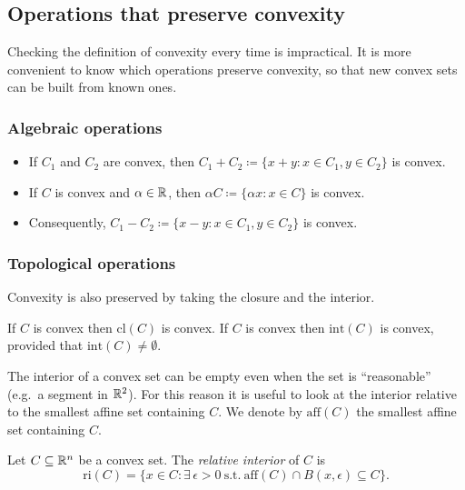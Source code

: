 \subsection{Operations that preserve convexity}

Checking the definition of convexity every time is impractical. It is more convenient to know which operations preserve convexity, so that new convex sets can be built from known ones.

\pagebreak
\subsubsection{Algebraic operations}

\begin{lemma}
\leavevmode
\begin{itemize}
    \item If $C_1$ and $C_2$ are convex, then $C_1 + C_2\coloneqq \{x+y: x \in C_1, y \in C_2\}$ is convex.
    \item If $C$ is convex and $\alpha \in \mathbb{R}$, then $\alpha C \coloneqq \{\alpha x : x \in C\}$ is convex.
    \item Consequently, $C_1 - C_2\coloneqq \{x-y: x \in C_1, y \in C_2\}$ is convex.
\end{itemize}
\end{lemma}

\subsubsection{Topological operations}

Convexity is also preserved by taking the closure and the interior.

\begin{lemma}
If $C$ is convex then $\mathrm{cl}(C)$ is convex.
If $C$ is convex then $\mathrm{int}(C)$ is convex, provided that $\mathrm{int}(C)\ne \emptyset$.
\end{lemma}

The interior of a convex set can be empty even when the set is ``reasonable'' (e.g.\ a segment in $\mathbb{R}^2$). For this reason it is useful to look at the interior relative to the smallest affine set containing $C$. We denote by $\mathrm{aff}(C)$ the smallest affine set containing $C$.

\begin{definition}
Let $C \subseteq \mathbb{R}^n$ be a convex set. The \emph{relative interior} of $C$ is
\[
    \mathrm{ri}(C)=\{x \in C : \exists\,\epsilon > 0\ \text{s.t.}\ \mathrm{aff}(C) \cap B(x,\epsilon)\subseteq C\}.
\]
\end{definition}

